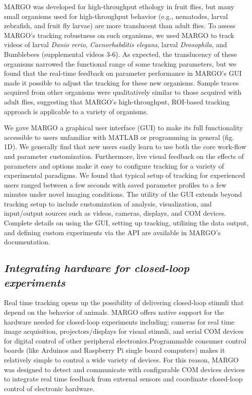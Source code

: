 \documentclass[10pt]{article}
\begin{document}
\begin{multicols}{2}
MARGO was developed for high-throughput ethology in fruit flies, but many small organisms used for high-throughput behavior (e.g., nematodes, larval zebrafish, and fruit fly larvae) are more translucent than adult flies. To assess MARGO’s tracking robustness on such organisms, we used MARGO to track videos of larval \emph{Danio rerio}, \emph{Caenorhabditis elegans}, larval \emph{Drosophila}, and Bumblebees (supplemental videos 3-6). As expected, the translucency of these organisms narrowed the functional range of some tracking parameters, but we found that the real-time feedback on parameter performance in MARGO's GUI made it possible to adjust the tracking for these new organisms. Sample traces acquired from other organisms were qualitatively similar to those acquired with adult flies, suggesting that MARGO’s high-throughput, ROI-based tracking approach is applicable to a variety of organisms.

We gave MARGO a graphical user interface (GUI) to make its full functionality accessible to users unfamiliar with MATLAB or programming in general (fig. 1D). We generally find that new users easily learn to use both the core work-flow and parameter customization. Furthermore, live visual feedback on the effects of parameters and options make it easy to configure tracking for a variety of experimental paradigms. We found that typical setup of tracking for experienced users ranged between a few seconds with saved parameter profiles to a few minutes under novel imaging conditions. The utility of the GUI extends beyond tracking setup to include customization of analysis, visualization, and input/output sources such as videos, cameras, displays, and COM devices. Complete details on using the GUI, setting up tracking, utilizing the data output, and defining custom experiments via the API are available in MARGO's documentation.


\subsection*{\textit{Integrating hardware for closed-loop experiments}}

Real time tracking opens up the possibility of delivering closed-loop stimuli that depend on the behavior of animals. MARGO offers native support for the hardware needed for closed-loop experiments including: cameras for real time image acquisition, projectors/displays for visual stimuli, and serial COM devices for digital control of other peripheral electronics.Programmable consumer control boards (like Arduinos and Raspberry Pi single board computers) makes it relatively simple to control a wide variety of devices. For this reason, MARGO was designed to detect and communicate with configurable COM devices devices to integrate real time feedback from external sensors and coordinate closed-loop control of electronic hardware. 


\end{multicols}
\end{document}
